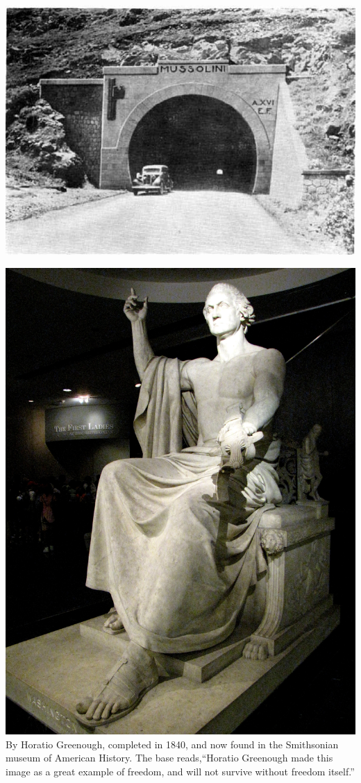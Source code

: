\begin{frame}
    \centering
    \includegraphics[width=.9\textwidth]{img/fasces/tunnel.jpg} \\
\end{frame}
\begin{frame}
    \centering
    \includegraphics[height=.8\textheight]{img/fasces/washington1.jpg} \\
    By Horatio Greenough, completed in 1840, and now found in the Smithsonian
    museum of American History. The base reads,``Horatio Greenough made this
    image as a great example of freedom, and will not survive without freedom
    itself.''
\end{frame}


